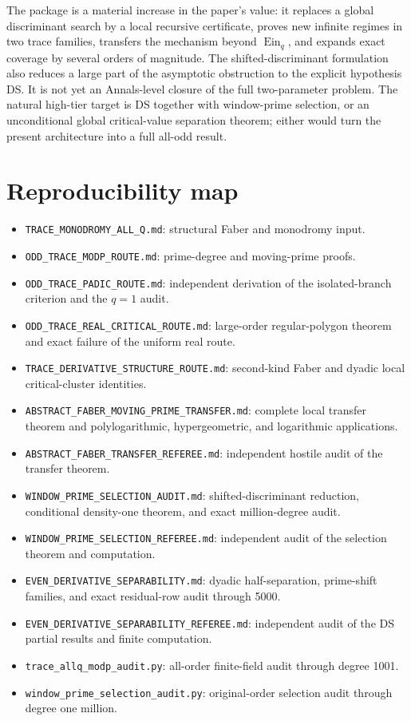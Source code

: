 \documentclass[11pt]{article}
\theoremstyle{keio}
\theoremstyle{keioinput}
\newcommand{\Ein}{\operatorname{Ein}}
\begin{document}
The package is a material increase in the paper's value: it replaces a
global discriminant search by a local recursive certificate, proves new
infinite regimes in two trace families, transfers the mechanism beyond
$\Ein_q$, and expands exact coverage by several orders of magnitude. The
shifted-discriminant formulation also reduces a large part of the asymptotic
obstruction to the explicit hypothesis DS. It is not yet an Annals-level
closure of the full two-parameter problem. The natural high-tier target is
DS together with window-prime selection, or an unconditional global
critical-value separation theorem; either would turn the present
architecture into a full all-odd result.

\section{Reproducibility map}

\begin{itemize}\raggedright
\item \nolinkurl{TRACE_MONODROMY_ALL_Q.md}: structural Faber and monodromy input.
\item \nolinkurl{ODD_TRACE_MODP_ROUTE.md}: prime-degree and moving-prime proofs.
\item \nolinkurl{ODD_TRACE_PADIC_ROUTE.md}: independent derivation of the
isolated-branch criterion and the $q=1$ audit.
\item \nolinkurl{ODD_TRACE_REAL_CRITICAL_ROUTE.md}: large-order
regular-polygon theorem and exact failure of the uniform real route.
\item \nolinkurl{TRACE_DERIVATIVE_STRUCTURE_ROUTE.md}: second-kind Faber and
dyadic local critical-cluster identities.
\item \nolinkurl{ABSTRACT_FABER_MOVING_PRIME_TRANSFER.md}: complete local
transfer theorem and polylogarithmic, hypergeometric, and logarithmic
applications.
\item \nolinkurl{ABSTRACT_FABER_TRANSFER_REFEREE.md}: independent hostile
audit of the transfer theorem.
\item \nolinkurl{WINDOW_PRIME_SELECTION_AUDIT.md}: shifted-discriminant
reduction, conditional density-one theorem, and exact million-degree audit.
\item \nolinkurl{WINDOW_PRIME_SELECTION_REFEREE.md}: independent audit of the
selection theorem and computation.
\item \nolinkurl{EVEN_DERIVATIVE_SEPARABILITY.md}: dyadic half-separation,
prime-shift families, and exact residual-row audit through 5000.
\item \nolinkurl{EVEN_DERIVATIVE_SEPARABILITY_REFEREE.md}: independent audit
of the DS partial results and finite computation.
\item \nolinkurl{trace_allq_modp_audit.py}: all-order finite-field audit
through degree 1001.
\item \nolinkurl{window_prime_selection_audit.py}: original-order selection
audit through degree one million.
\end{itemize}
\end{document}

